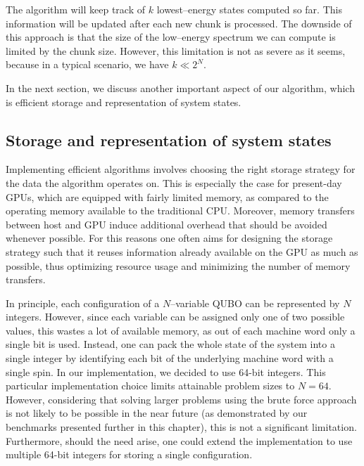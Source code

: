 The algorithm will keep track of $k$ lowest--energy states computed so far.
This information will be updated after each new chunk is processed. The
downside of this approach is that the size of the low--energy spectrum we can
compute is limited by the chunk size. However, this limitation is not as severe
as it seems, because in a typical scenario, we have $k \ll 2^{N}$.

In the next section, we discuss another important aspect of our algorithm,
which is efficient storage and representation of system states.

\subsection{Storage and representation of system states}
Implementing efficient algorithms involves choosing the right storage strategy
for the data the algorithm operates on. This is especially the case for
present-day GPUs, which are equipped with fairly limited memory, as compared to
the operating memory available to the traditional CPU. Moreover, memory
transfers between host and GPU induce additional overhead that should be
avoided whenever possible. For this reasons one often aims for designing the
storage strategy such that it reuses information already available on the GPU
as much as possible, thus optimizing resource usage and minimizing the number
of memory transfers.

In principle, each configuration of a $N$--variable QUBO can be represented by
$N$ integers. However, since each variable can be assigned only one of two
possible values, this wastes a lot of available memory, as out of each machine
word only a single bit is used. Instead, one can pack the whole state of the
system into a single integer by identifying each bit of the underlying machine
word with a single spin. In our implementation, we decided to use 64-bit
integers. This particular implementation choice limits attainable problem sizes
to $N=64$. However, considering that solving larger problems using the brute
force approach is not likely to be possible in the near future (as demonstrated
by our benchmarks presented further in this chapter), this is not a significant
limitation. Furthermore, should the need arise, one could extend the
implementation to use multiple 64-bit integers for storing a single
configuration.

